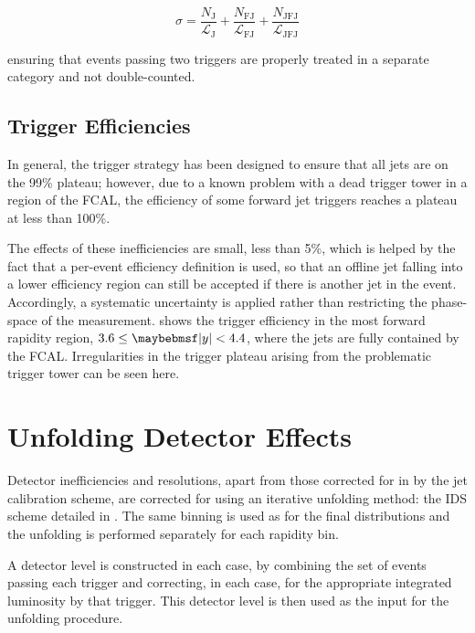 \begin{equation}
 \sigma = \frac{N_{\mathrm{J}}}{\mathcal{L}_{\mathrm{J}}} + \frac{N_{\mathrm{FJ}}}{\mathcal{L}_{\mathrm{FJ}}} + \frac{N_{\mathrm{JFJ}}}{\mathcal{L}_{\mathrm{JFJ}}}
\end{equation}

\noindent ensuring that events passing two triggers are properly treated in a separate
category and not double-counted.

\subsection{Trigger Efficiencies}
\label{sec:forward-inclusive:trigger_efficiencies}
In general, the trigger strategy has been designed to ensure that all jets are on
the 99\% plateau; however, due to a known problem with a dead trigger tower in a
region of the FCAL, the efficiency of some forward jet triggers reaches a plateau
at less than 100\%.

The effects of these inefficiencies are small, less than 5\%, which is helped by
the fact that a per-event efficiency definition is used, so that an offline jet
falling into a lower efficiency region can still be accepted if there is another
jet in the event. Accordingly, a systematic uncertainty is applied rather than restricting
the phase-space of the measurement. 
shows the trigger efficiency in the most forward rapidity region, $3.6 \leq \absRap < 4.4$,
where the jets are fully contained by the FCAL. Irregularities in the trigger
plateau arising from the problematic trigger tower can be seen here.

\section{Unfolding Detector Effects}
\label{sec:forward-inclusive:unfolding}
Detector inefficiencies and resolutions, apart from those corrected for in by
the jet calibration scheme, are corrected for using an iterative unfolding
method: the IDS scheme detailed in .
The same binning is used as for the final distributions and the unfolding is
performed separately for each rapidity bin.

A detector level \xs is constructed in each case, by combining the set of events
passing each trigger and correcting, in each case, for the appropriate integrated luminosity by
that trigger. This detector level \xs is then used as the input for the unfolding
procedure.

